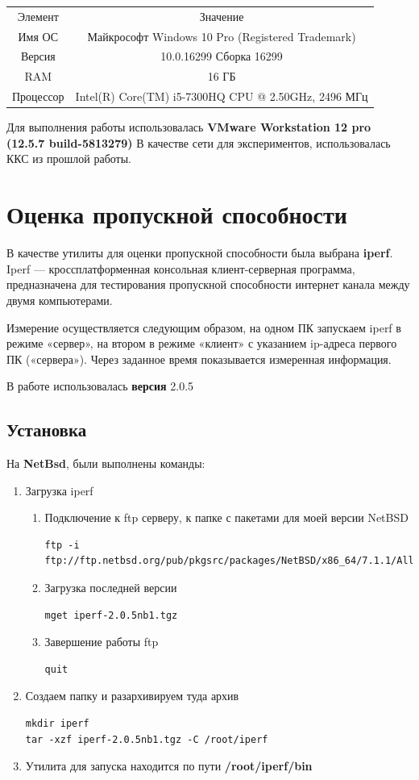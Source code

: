 \documentclass[14pt,a4paper,report]{report}
\begin{document}
\begin{center}
\begin{tabular}{ c c  }
Элемент & Значение \\ 
Имя ОС & Майкрософт Windows 10 Pro (Registered Trademark)\\ 
Версия&10.0.16299 Сборка 16299\\
RAM &16 ГБ\\ 
Процессор&Intel(R) Core(TM) i5-7300HQ CPU @ 2.50GHz, 2496 МГц \\ 
\end{tabular}
\end{center}


Для выполнения работы использовалась \textbf{VMware Workstation 12 pro (12.5.7 build-5813279)}
В качестве сети для экспериментов, использовалась ККС из прошлой работы.

\section{Оценка пропускной способности}
В качестве утилиты для оценки пропускной способности была выбрана \textbf{iperf}.  Iperf — кроссплатформенная консольная клиент-серверная программа, предназначена для тестирования пропускной способности интернет канала между двумя компьютерами.

Измерение осуществляется следующим образом, на одном ПК запускаем iperf в режиме «сервер», на втором в режиме «клиент» с указанием ip-адреса первого ПК («сервера»). Через заданное время показывается измеренная информация. 

В работе использовалась \textbf{версия} 2.0.5
\subsection{Установка}
На \textbf{NetBsd}, были выполнены команды:
\begin{enumerate}
\item Загрузка iperf
\begin{enumerate}
\item Подключение к ftp серверу, к папке с пакетами для моей версии NetBSD
\begin{lstlisting}[language={}]
ftp -i ftp://ftp.netbsd.org/pub/pkgsrc/packages/NetBSD/x86_64/7.1.1/All/
\end{lstlisting}
\item Загрузка последней версии
\begin{lstlisting}[language={}]
mget iperf-2.0.5nb1.tgz
\end{lstlisting}
\item Завершение работы ftp
\begin{lstlisting}[language={}]
quit
\end{lstlisting}
\end{enumerate}
\item Создаем папку и разархивируем туда архив
\begin{lstlisting}[language={}]
mkdir iperf
tar -xzf iperf-2.0.5nb1.tgz -C /root/iperf
\end{lstlisting}
\item Утилита для запуска находится по пути \textbf{/root/iperf/bin}
\end{enumerate}
\end{document}
